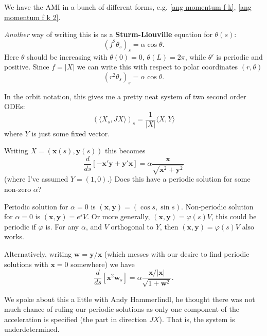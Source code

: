 \documentclass[12pt, a4paper]{amsart}
\theoremstyle{remark}
\begin{document}
We have the AMI in a bunch of different forms, e.g. \eqref{ang momentum f k}, \eqref{ang momentum f k 2}.


\emph{Another} way of writing this is as a  \textbf{Sturm-Liouville} equation for $\theta(s)$:
$$(f^2 \theta_s )_s=\alpha\cos\theta.$$
Here $\theta$ should be increasing with $\theta(0)=0$, $\theta(L)=2\pi$, while $\theta'$ is periodic and positive.   Since $f=|X|$ we can write this with respect to polar coordinates $(r,\theta)$
$$(r^2 \theta_s )_s=\alpha\cos\theta.$$

In the orbit notation, this gives me a pretty neat system of two second order ODEs:
$$\left(\langle X_s, JX\rangle\right)_s= \frac1{|X|}\langle X,Y\rangle$$
where $Y$ is just some fixed vector.

\newcommand{\bx}{\mathbf{x}}
\newcommand{\by}{\mathbf{y}}

Writing $X=(\bx(s),\by(s))$ this becomes
$$\dfrac{d}{ds}\left[ -\bx'\by+ \by' \bx\right]= \alpha \frac{\bx}{\sqrt{\bx^2 +\by^2}}$$
(where I've assumed $Y=(1,0)$.)  Does this have a periodic solution for some non-zero $\alpha$?    

Periodic solution for $\alpha=0$ is $(\bx,\by)=(\cos s, \sin s)$.     Non-periodic solution for $\alpha=0$ is  $(\bx,\by)=e^s V$.  Or more generally, $ (\bx,\by)=\varphi(s) V$, this could be periodic if $\varphi$ is.   For any $\alpha$, and $V$ orthogonal to $Y$, then  $(\bx,\by)= \varphi(s) V$ also works.   

Alternatively, writing $\mathbf{w}=\by/\bx$ (which messes with our desire to find periodic solutions with $\bx=0$ somewhere) we have
$$   \dfrac{d}{ds}\left[ \bx^2 \mathbf{w}_s\right]= \alpha \frac{\bx/|\bx|}{\sqrt{1 +\mathbf{w}^2}}.$$




We spoke about this a little with Andy Hammerlindl, he thought there was not much chance of ruling our periodic solutions as only one component of the acceleration is specified   (the part in direction $JX$).     That is, the system is underdetermined.   
\end{document}

